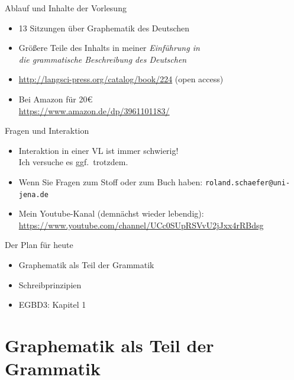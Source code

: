 \begin{frame}
  {Ablauf und Inhalte der Vorlesung}
  \begin{itemize}
    \item 13 Sitzungen über Graphematik des Deutschen
    \item Größere Teile des Inhalts in meiner \alert{\textit{Einführung in\\
      die grammatische Beschreibung des Deutschen}} 
    \item \url{http://langsci-press.org/catalog/book/224} (\alert{open access})
      \vspace{\baselineskip}
    \item Bei Amazon für 20€\\
      \url{https://www.amazon.de/dp/3961101183/}
  \end{itemize}
\end{frame}

\begin{frame}
  {Fragen und Interaktion}
  \begin{itemize}
    \item Interaktion in einer VL ist immer schwierig!\\
      Ich versuche es ggf.\ trotzdem.
      \Zeile
    \item Wenn Sie Fragen zum Stoff oder zum Buch haben:
      \texttt{roland.schaefer@uni-jena.de}
      \Zeile
    \item Mein Youtube-Kanal (demnächst wieder lebendig):\\
      \url{https://www.youtube.com/channel/UCc0SUpRSVvU2jJxx4rRBdsg}
  \end{itemize}
\end{frame}

\begin{frame}
  {Der Plan für heute}
  \pause
  \begin{itemize}
    \item Graphematik als Teil der Grammatik
    \item Schreibprinzipien
    \Zeile
    \item EGBD3: Kapitel 1
  \end{itemize}
\end{frame}


\section[Graphematik]{Graphematik als Teil der Grammatik}

